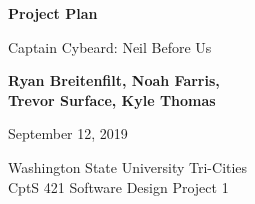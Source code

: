 \begin{titlepage}
    \begin{center}
        \vspace*{1cm}

        \Huge
        \textbf{Project Plan}

        \vspace{.5cm}
        \LARGE
        Captain Cybeard: Neil Before Us

        \vspace{1cm}

        \textbf{Ryan Breitenfilt, Noah Farris,\\ Trevor Surface, Kyle Thomas}

        \vspace{.2cm}
        \Large
        September 12, 2019

        \vspace{2cm}

        \vfill

        Washington State University Tri-Cities\\
        CptS 421 Software Design Project 1

    \end{center}
\end{titlepage}


